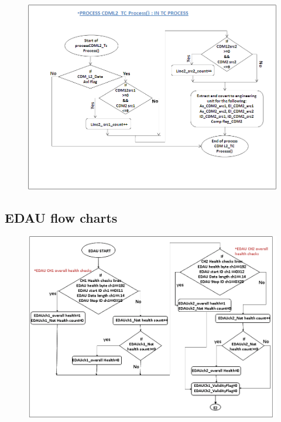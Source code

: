\begin{figure}[H]
	\centering
	\includegraphics[width=\linewidth]{./FlowCharts/PngFlowCharts/TCP9.png}
\end{figure}

\subsection{EDAU flow charts}
\begin{figure}[H]
	\centering
	\includegraphics[width=\linewidth]{./FlowCharts/PngFlowCharts/EDAU1.png}
\end{figure}

